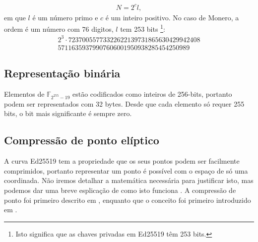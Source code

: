 \begin{enumerate}
\vspace{.175cm}
\begin{align*}
N=2^c l ,
\end{align*}
em que $l$ é um número primo e $c$ é um inteiro positivo. No caso de Monero, a ordem é um número com 76 digitos, $l$ tem 253 bits \footnote{Isto significa que as chaves privadas em Ed25519 têm 253 bits.}: 
\vspace{.175cm}
\begin{align*}
2^3 \cdot 72370055773322622139731865630429942408\\57116359379907606001950938285454250989
\end{align*}


\subsection{Representação binária}
\label{binary_note}
Elementos de \(\mathbb{F}_{2^{255} - 19} \) estão codificados como inteiros de 256-bits, portanto podem ser representados com 32 bytes. Desde que cada elemento só requer 255 bits, o bit mais significante é sempre zero. 


\subsection{Compressão de ponto elíptico}
\label{point_compression_section}

A curva Ed25519 tem a propriedade que os seus pontos podem ser facilmente comprimidos, portanto representar um ponto é possível com o espaço de só uma coordinada. Não iremos detalhar a matemática necessária para justificar isto, mas podemos dar uma breve esplicação de como isto funciona \cite{eddsa-ed25519-irtf}. A compressão de ponto foi primeiro descrito em \cite{Bernstein2012}, enquanto que o conceito foi primeiro introduzido em \cite{Miller:point-compression-origin}.


\end{enumerate}
